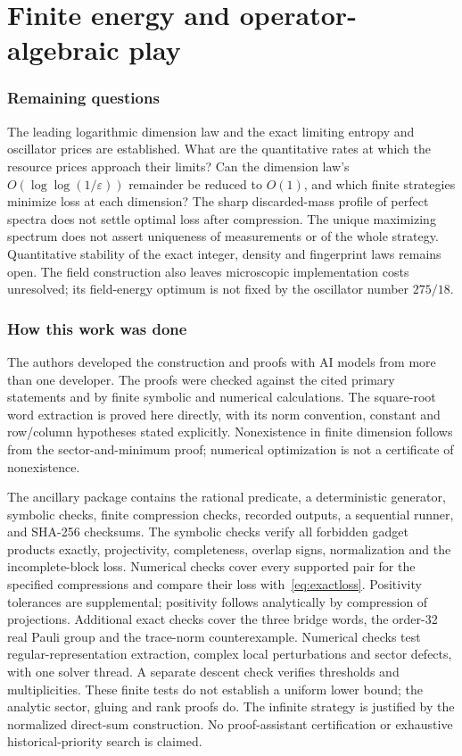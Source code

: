 \documentclass[11pt]{article}
\theoremstyle{definition}
\newcommand{\eps}{\varepsilon}
\begin{document}
\clearpage
\part*{Finite energy and operator-algebraic play}






\section*{Remaining questions}
The leading logarithmic dimension law and the exact limiting entropy and oscillator prices are established. What are the quantitative rates at which the resource prices approach their limits? Can the dimension law's $O(\log\log(1/\eps))$ remainder be reduced to $O(1)$, and which finite strategies minimize loss at each dimension? The sharp discarded-mass profile of perfect spectra does not settle optimal loss after compression. The unique maximizing spectrum does not assert uniqueness of measurements or of the whole strategy. Quantitative stability of the exact integer, density and fingerprint laws remains open. The field construction also leaves microscopic implementation costs unresolved; its field-energy optimum is not fixed by the oscillator number $275/18$.

\section*{How this work was done}
The authors developed the construction and proofs with AI models from more than one developer. The proofs were checked against the cited primary statements and by finite symbolic and numerical calculations. The square-root word extraction is proved here directly, with its norm convention, constant and row/column hypotheses stated explicitly. Nonexistence in finite dimension follows from the sector-and-minimum proof; numerical optimization is not a certificate of nonexistence.

The ancillary package contains the rational predicate, a deterministic generator, symbolic checks, finite compression checks, recorded outputs, a sequential runner, and SHA-256 checksums. The symbolic checks verify all forbidden gadget products exactly, projectivity, completeness, overlap signs, normalization and the incomplete-block loss. Numerical checks cover every supported pair for the specified compressions and compare their loss with~\eqref{eq:exactloss}. Positivity tolerances are supplemental; positivity follows analytically by compression of projections. Additional exact checks cover the three bridge words, the order-32 real Pauli group and the trace-norm counterexample. Numerical checks test regular-representation extraction, complex local perturbations and sector defects, with one solver thread. A separate descent check verifies thresholds and multiplicities. These finite tests do not establish a uniform lower bound; the analytic sector, gluing and rank proofs do. The infinite strategy is justified by the normalized direct-sum construction. No proof-assistant certification or exhaustive historical-priority search is claimed.
\end{document}
